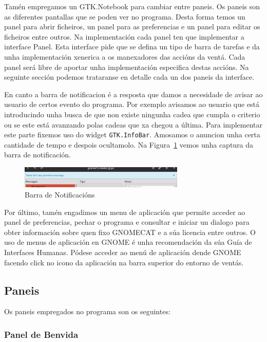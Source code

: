 Tamén empregamos un GTK.Notebook para cambiar entre paneis. Os paneis son as diferentes pantallas que se poden ver no programa. Desta forma temos un panel para abrir ficheiros, un panel para as preferencias e un panel para editar os ficheiros entre outros. Na implementación cada panel ten que implementar a interface Panel. Esta interface pide que se defina un tipo de barra de tarefas e da unha implementación xenerica a os manexadores das accións da ventá. Cada panel será libre de aportar unha implementación especifica destas accións. Na seguinte sección podemos trataranse en detalle cada un dos paneis da interface.

En canto a barra de notificacion é a resposta que damos a necesidade de avisar ao usuario de certos evento do programa. Por exemplo avisamos ao usuario que está introducindo unha busca de que non existe ningunha cadea que cumpla o criterio ou se este está avanzando polas cadeas que xa chegou a última. Para implementar este parte fixemos uso do widget \lstinline{GTK.InfoBar}. Amosamos o anuncion unha certa cantidade de tempo e despois ocultamolo. Na Figura~\ref{fig:ui:v3:infobar} vemos unha captura da barra de notificación.

\begin{figure}[h!]
  \centering
    \includegraphics[width=0.7\textwidth]{img/gsoc2_it3_ui.png}
    \caption{Barra de Notificacións}
    \label{fig:ui:v3:infobar}
\end{figure}

Por último, tamén engadimos un menu de aplicación que permite acceder ao panel de preferencias, pechar o programa e consultar e iniciar un dialogo para obter información sobre quen fixo GNOMECAT e a súa licencia entre outros. O uso de menus de aplicación en GNOME é unha recomendación da súa Guía de Interfaces Humanas. Pódese acceder ao menú de aplicación dende GNOME facendo click no icono da aplicación na barra superior do entorno de ventás.

\subsection{Paneis}
Os paneis empregados no programa son os seguintes:

\subsubsection{Panel de Benvida}

